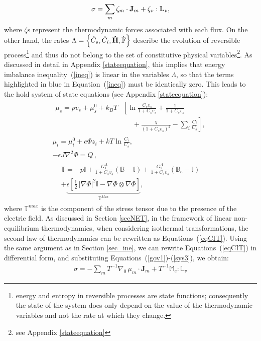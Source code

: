 \begin{equation}
\sigma = \sum_m \zeta_m \cdot \mathbf{J}_m + \zeta_v : \mathbb{L}_v,
\label{dis}
\end{equation}
where $\zeta$s represent the thermodynamic forces associated with each flux. On the other hand, the rates $\Lambda =\left\{\dot{C}_s,\dot{C}_i,\mathbf{\dot{H}},\dot{\mathbb{F}}\right\}$ describe the evolution of reversible process\footnote{energy and entropy in reversible processes are state functions; consequently the state of the system does only depend on the value of the thermodynamic variables and not the rate at which they change.} and thus do not belong to the set of constitutive physical variables\footnote{see Appendix \ref{stateequation}}. As discussed in detail in Appendix \ref{stateequation}, this implies that energy imbalance inequality~(\ref{ineq}) is linear in the variables $\Lambda$, so that the terms highlighted in blue in Equation~(\ref{ineq}) must be identically zero. This leads to the hold system of state equations (see Appendix \ref{stateequation}):
\begin{gather}
\begin{aligned}
\mu_s = p v_s + \mu_s^0 + k_BT&\left[\ln \frac{C_s v_s}{1+C_s v_s} + \frac{1}{1+C_sv_s}\right.\\
&\left.\ \ \ \ \ \ +\frac{\chi}{(1+C_s v_s)^2}-\sum_i \frac{C_i}{C_s}\right], 
\end{aligned}\label{gov1}\\[2.5mm]
\mu_i = \mu^0_i + e\Phi z_i + kT \ln \frac{C_i}{C_s},\label{mu}\\
-\epsilon J \nabla^2 \Phi = Q\, ,\label{sys2}
\end{gather}
\begin{gather}
\begin{aligned}
\mathbb{T}= -p \mathbb{I}+ \frac{G^A_1}{1+C_sv_s}\left(\mathbb{B}-\mathbb{I}\right) + \frac{G^A_2}{1+C_sv_s}\left(\mathbb{B}_e-\mathbb{I}\right) \\
+ \underbrace{\epsilon \left[\frac{1}{2} \,|\nabla \Phi|^2\mathbb{I} -\nabla \Phi \otimes \nabla \Phi\right]}_{\mathbb{T}^{Max}},
\end{aligned}
\label{sys3}
\end{gather}
where $\mathbb{T}^{max}$ is the component of the stress tensor due to the presence of the electric field. As discussed in Section \ref{secNET}, in the framework of linear non-equilibrium thermodynamics, when considering isothermal transformations, the second law of thermodynamics can be rewritten as Equations~(\ref{eqCIT}). Using the same argument as in Section \ref{sec_ine}, we can rewrite Equations~(\ref{eqCIT}) in differential form, and substituting Equations~(\ref{gov1})-(\ref{sys3}), we obtain:
\begin{equation}
\begin{aligned}
\sigma = -  \sum_m T^{-1} \nabla_0 \,\mu_m \cdot \mathbf{J}_m + T^{-1}\mathbb{M}_e:\mathbb{L}_v\label{EQen}
\end{aligned} 
\end{equation}

